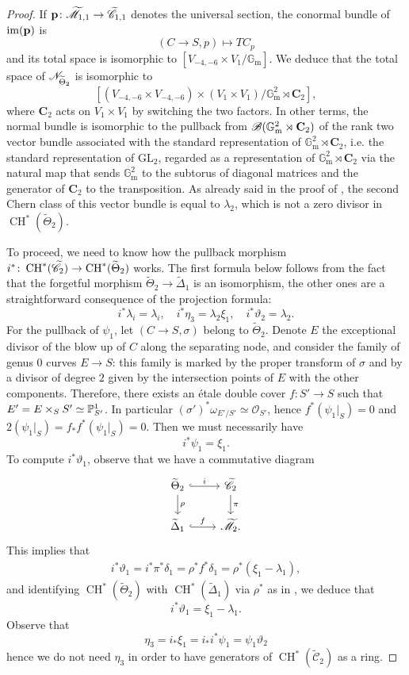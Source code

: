 \documentclass[a4paper, 10pt]{amsart}
\numberwithin{equation}{section}
\numberwithin{subsection}{section}
\theoremstyle{definition}
\theoremstyle{remark}
\renewcommand{\mathcal}{\mathscr}
\newcommand\cO{\mathcal{O}} \newcommand\cP{\mathcal{P}}
\newcommand\GG{\mathbb{G}} \newcommand\HH{\mathbb{H}}
\newcommand\bC{\mathbf{C}} \newcommand\bD{\mathbf{D}}
\newcommand\rmm{\mathrm{m}} \newcommand\rmn{\mathrm{n}}
\newcommand\arr{\ifinner\to\else\longrightarrow\fi}
\newcommand\im[1]{\operatorname{im}(#1)}
\newcommand{\gm}{\GG_{\rmm}}
\newcommand{\GL}{\mathrm{GL}}
\newcommand{\Mtilde}{\widetilde{\mathcal M}}
\newcommand{\Ctilde}{\widetilde{\mathcal C}}
\newcommand{\Dtilde}{\widetilde{\Delta}}
\newcommand{\ThTilde}{\widetilde{\Theta}}
\newcommand{\ch}[1][*]{\operatorname{CH}^{#1}}
\begin{document}
\begin{proof}
		If $\bfp\colon\Mtilde_{1,1}\arr\Ctilde_{1,1}$ denotes the universal section, the conormal bundle of $\im{\bfp}$ is
		\[ (C\to S,p)\longmapsto TC_p \]
		and its total space is isomorphic to $[V_{-4,-6}\times V_1/\gm]$. We deduce that the total space of $\cN_{\ThTilde_2}$ is isomorphic to
		\[ [ (V_{-4,-6}\times V_{-4,-6})\times (V_1\times V_1)/\gm^2\rtimes\bC_2 ],  \]
		where $\bC_2$ acts on $V_1\times V_1$ by switching the two factors. In other terms, the normal bundle is isomorphic to the pullback from $\cB(\gm^2\rtimes\bC_2)$ of the rank two vector bundle associated with the standard representation of $\gm^2\rtimes\bC_2$, i.e. the standard representation of $\GL_2$, regarded as a representation of $\gm^2\rtimes\bC_2$ via the natural map that sends $\gm^2$ to the subtorus of diagonal matrices and the generator of $\bC_2$ to the transposition. As already said in the proof of , the second Chern class of this vector bundle is equal to $\lambda_2$, which is not a zero divisor in $\ch(\ThTilde_2)$.
		
		To proceed, we need to know how the pullback morphism $i^*\colon\ch(\Ctilde_2)\arr\ch(\ThTilde_2)$ works. The first formula below follows from the fact that the forgetful morphism $\ThTilde_2\to\Dtilde_1$ is an isomorphism, the other ones are a straightforward consequence of the projection formula:
		\begin{equation}\label{eq:pullback theta2} i^*\lambda_i=\lambda_i,\quad i^*\eta_3=\lambda_2\xi_1, \quad i^*\vartheta_2=\lambda_2. \end{equation}
		For the pullback of $\psi_1$, let $(C\to S,\sigma)$ belong to $\ThTilde_2$. Denote $E$ the exceptional divisor of the blow up of $C$ along the separating node, and consider the family of genus $0$ curves $E\to S$: this family is marked by the proper transform of $\sigma$ and by a divisor of degree $2$ given by the intersection points of $E$ with the other components. Therefore, there exists an \'{e}tale double cover $f:S'\to S$ such that $E'=E\times_S S'\simeq \mathbb{P}^1_{S'}$. In particular $(\sigma')^* \omega_{E'/S'} \simeq \cO_{S'}$, hence $f^*(\psi_1|_S)=0$ and $2(\psi_1|_S)=f_*f^*(\psi_1|_S)=0$. Then we must necessarily have 
		\begin{equation}\label{eq:pullback psi1} i^*\psi_1=\xi_1.\end{equation}
		To compute $i^*\vartheta_1$, observe that we have a commutative diagram
		\[\begin{tikzcd}        
			\ThTilde_2 \arrow[hook]{r}{i} \arrow{d}{\rho} & \Ctilde_2 \arrow{d}{\pi}  \\
			\Dtilde_1  \arrow[hook]{r}{f} & \Mtilde_2.
		\end{tikzcd}\]
		This implies that 
		\begin{align*}
			i^*\vartheta_1=i^*\pi^*\delta_1=\rho^*f^*\delta_1=\rho^*(\xi_1-\lambda_1),
		\end{align*} 
		and identifying $\ch(\ThTilde_2)$ with $\ch(\Dtilde_1)$ via $\rho^*$ as in , we deduce that
		\[ i^*\vartheta_1=\xi_1-\lambda_1. \]
		Observe that 
		\[\eta_3=i_*\xi_1=i_*i^*\psi_1=\psi_1\vartheta_2\]
		hence we do not need $\eta_3$ in order to have generators of $\ch(\Ctilde_2)$ as a ring.
		

\end{proof}
\end{document}
